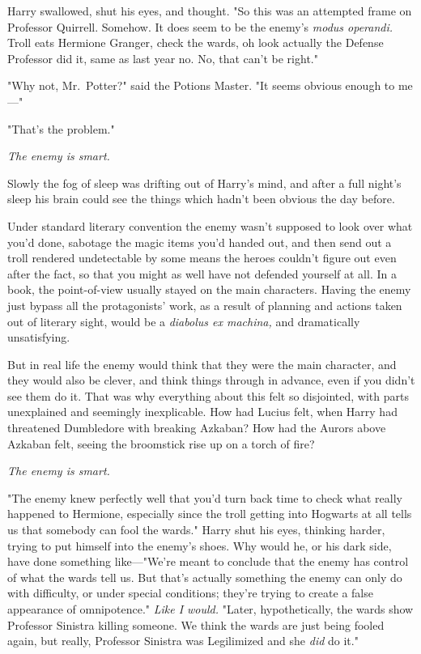 Harry swallowed, shut his eyes, and thought. "So this was an attempted frame on
Professor Quirrell. Somehow. It does seem to be the enemy's \emph{modus
operandi.} Troll eats Hermione Granger, check the wards, oh look actually the
Defense Professor did it, same as last year{\el} no. No, that can't be
right."

"Why not, Mr.~Potter?" said the Potions Master. "It seems obvious enough to
me\mbox{---}"

"That's the problem."

\emph{The enemy is smart.}

Slowly the fog of sleep was drifting out of Harry's mind, and after a full
night's sleep his brain could see the things which hadn't been obvious the day
before.

Under standard literary convention{\el} the enemy wasn't supposed to look
over what you'd done, sabotage the magic items you'd handed out, and then send
out a troll rendered undetectable by some means the heroes couldn't figure out
even after the fact, so that you might as well have not defended yourself at
all. In a book, the point-of-view usually stayed on the main characters. Having
the enemy just bypass all the protagonists' work, as a result of planning and
actions taken out of literary sight, would be a \emph{diabolus ex machina,} and
dramatically unsatisfying.

But in real life the enemy would think that they were the main character, and
they would also be clever, and think things through in advance, even if you
didn't see them do it. That was why everything about this felt so disjointed,
with parts unexplained and seemingly inexplicable. How had Lucius felt, when
Harry had threatened Dumbledore with breaking Azkaban? How had the Aurors above
Azkaban felt, seeing the broomstick rise up on a torch of fire?

\emph{The enemy is smart.}

"The enemy knew perfectly well that you'd turn back time to check what really
happened to Hermione, especially since the troll getting into Hogwarts at all
tells us that somebody can fool the wards." Harry shut his eyes, thinking
harder, trying to put himself into the enemy's shoes. Why would he, or his dark
side, have done something like\mbox{---}"We're meant to conclude that the enemy has
control of what the wards tell us. But that's actually something the enemy can
only do with difficulty, or under special conditions; they're trying to create
a false appearance of omnipotence." \emph{Like I would.} "Later,
hypothetically, the wards show Professor Sinistra killing someone. We think the
wards are just being fooled again, but really, Professor Sinistra was
Legilimized and she \emph{did} do it."

